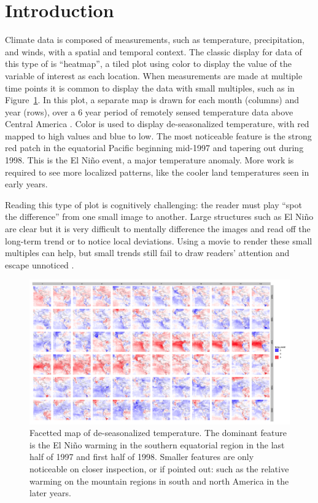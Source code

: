 \documentclass[oneside]{article}
\begin{document}
\section{Introduction}

Climate data is composed of measurements, such as temperature, precipitation, and winds, with a spatial and temporal context. The classic display for data of this type of is ``heatmap'', a tiled plot using color to display the value of the variable of interest as each location. When measurements are made at multiple time points it is common to display the data with small multiples, such as in Figure~\ref{fig:nasa-facet}. In this plot, a separate map is drawn for each month (columns) and year (rows), over a 6 year period of remotely sensed temperature data above Central America \citep{murrell:2010}. Color is used to display de-seasonalized temperature, with red mapped to high values and blue to low. The most noticeable feature is the strong red patch in the equatorial Pacific beginning mid-1997 and tapering out during 1998. This is the El Ni\~no event, a major temperature anomaly. More work is required to see more localized patterns, like the cooler land temperatures seen in early years.

Reading this type of plot is cognitively challenging: the reader must play ``spot the difference'' from one small image to another. Large structures such as El Ni\~no are clear but it is very difficult to mentally difference the images and read off the long-term trend or to notice local deviations. Using a movie to render these small multiples can help, but small trends still fail to draw readers' attention and escape unnoticed \citep{simons:gradual}.

\begin{figure}[htbp]
  \centering
  \includegraphics[width=5.5in]{nasa-colored-map.png}
  \caption{Facetted map of de-seasonalized temperature. The dominant feature is the El Ni\~no warming in the southern equatorial region in the last half of 1997 and first half of 1998. Smaller features are only noticeable on closer inspection, or if pointed out: such as the relative warming on the mountain regions in south and north America in the later years.}
  \label{fig:nasa-facet}
\end{figure}
\end{document}
